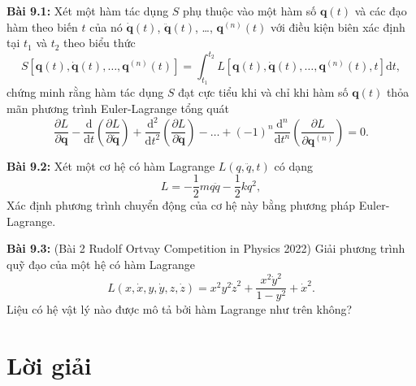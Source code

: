 \textbf{Bài 9.1:} Xét một hàm tác dụng \(S\) phụ thuộc vào một hàm số \(\mathbf{q}(t)\) và các đạo hàm theo biến \(t\) của nó \(\mathbf{\dot{q}}(t)\), \(\mathbf{\ddot{q}}(t)\), \ldots, \(\mathbf{q}^{(n)} (t)\) với điều kiện biên xác định tại \(t_1\) và \(t_2\) theo biểu thức
\begin{equation}
    S \left[\mathbf{q}(t), \mathbf{\dot{q}}(t), \ldots, \mathbf{q}^{(n)} (t)\right] = \int_{t_1}^{t_2} L\left[ \mathbf{q}(t), \mathbf{\dot{q}}(t), \ldots, \mathbf{q}^{(n)} (t), t \right] \mathrm{d}t,
\end{equation}
chứng minh rằng hàm tác dụng \(S\) đạt cực tiểu khi và chỉ khi hàm số \(\mathbf{q}(t)\) thỏa mãn phương trình Euler-Lagrange tổng quát
\begin{equation}
    \frac{\partial L}{\partial \mathbf{q}} - \frac{\mathrm{d}}{\mathrm{d}t} \left( \frac{\partial L}{\partial \mathbf{\dot{q}}} \right) + \dfrac{\mathrm{d}^2}{\mathrm{d} t^2} \left( \dfrac{\partial L}{\partial \mathbf{\ddot{q}}}\right) - \ldots + (-1)^n \frac{\mathrm{d}^n}{\mathrm{d}t^n} \left( \frac{\partial L}{\partial \mathbf{q}^{(n)}} \right) = 0.
\end{equation}

\textbf{Bài 9.2:} Xét một cơ hệ có hàm Lagrange \(L ( q, \ddot{q}, t)\) có dạng
\begin{equation}
    L = -\dfrac{1}{2} m q \ddot{q} - \dfrac{1}{2} k q^2,
\end{equation}
Xác định phương trình chuyển động của cơ hệ này bằng phương pháp Euler-Lagrange.

\textbf{Bài 9.3:} (Bài 2 Rudolf Ortvay Competition in Physics 2022) Giải phương trình quỹ đạo của một hệ có hàm Lagrange
\begin{equation}
    L (x, \dot{x}, y, \dot{y}, z, \dot{z}) = x^2 y^2 \dot{z}^2 + \dfrac{x^2 \dot{y}^2}{1-y^2} + \dot{x}^2.
\end{equation}
Liệu có hệ vật lý nào được mô tả bởi hàm Lagrange như trên không?

\section{Lời giải}


\begin{refsection}
\nocite{cline2017variational,morin2008introduction,kompaneyets2013theoretical,dao2002cohocgiaitich}
\printbibliography
\end{refsection}